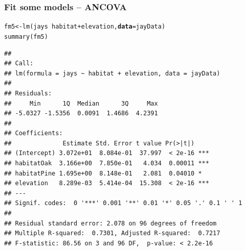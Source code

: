 \documentclass[color=usenames,dvipsnames]{beamer}\usepackage[]{graphicx}\usepackage[]{color}
\makeatletter
\newcommand{\hlopt}[1]{\textcolor[rgb]{0,0,0}{#1}}%
\newcommand{\hlstd}[1]{\textcolor[rgb]{0,0,0}{#1}}%
\newcommand{\hlkwb}[1]{\textcolor[rgb]{0,0.341,0.682}{#1}}%
\newcommand{\hlkwc}[1]{\textcolor[rgb]{0,0,0}{\textbf{#1}}}%
\newcommand{\hlkwd}[1]{\textcolor[rgb]{0.004,0.004,0.506}{#1}}%
\newenvironment{kframe}{%
 \def\at@end@of@kframe{}%
 \ifinner\ifhmode%
  \def\at@end@of@kframe{\end{minipage}}%
  \begin{minipage}{\columnwidth}%
 \fi\fi%
 \def\FrameCommand##1{\hskip\@totalleftmargin \hskip-\fboxsep
 \colorbox{shadecolor}{##1}\hskip-\fboxsep
     \hskip-\linewidth \hskip-\@totalleftmargin \hskip\columnwidth}%
 \MakeFramed {\advance\hsize-\width
   \@totalleftmargin\z@ \linewidth\hsize
   \@setminipage}}%
 {\par\unskip\endMakeFramed%
 \at@end@of@kframe}
\newenvironment{knitrout}{}{} %
\makeatother
\begin{document}
\begin{frame}[fragile]
  \frametitle{Fit some models -- ANCOVA}
\begin{knitrout}\scriptsize
{}\color{fgcolor}\begin{kframe}
\begin{alltt}
\hlstd{fm5} \hlkwb{<-} \hlkwd{lm}\hlstd{(jays} \hlopt{~} \hlstd{habitat} \hlopt{+} \hlstd{elevation,} \hlkwc{data}\hlstd{=jayData)}
\hlkwd{summary}\hlstd{(fm5)}
\end{alltt}
\begin{verbatim}
## 
## Call:
## lm(formula = jays ~ habitat + elevation, data = jayData)
## 
## Residuals:
##     Min      1Q  Median      3Q     Max 
## -5.0327 -1.5356  0.0091  1.4686  4.2391 
## 
## Coefficients:
##              Estimate Std. Error t value Pr(>|t|)    
## (Intercept) 3.072e+01  8.084e-01  37.997  < 2e-16 ***
## habitatOak  3.166e+00  7.850e-01   4.034  0.00011 ***
## habitatPine 1.695e+00  8.148e-01   2.081  0.04010 *  
## elevation   8.289e-03  5.414e-04  15.308  < 2e-16 ***
## ---
## Signif. codes:  0 '***' 0.001 '**' 0.01 '*' 0.05 '.' 0.1 ' ' 1
## 
## Residual standard error: 2.078 on 96 degrees of freedom
## Multiple R-squared:  0.7301,	Adjusted R-squared:  0.7217 
## F-statistic: 86.56 on 3 and 96 DF,  p-value: < 2.2e-16
\end{verbatim}
\end{kframe}
\end{knitrout}
\end{frame}
\end{document}
